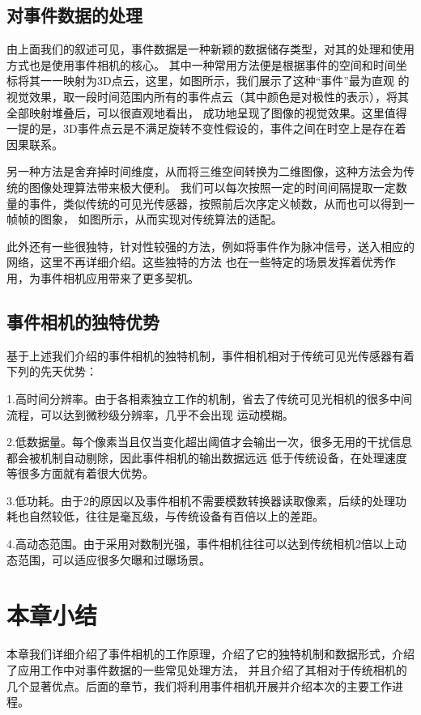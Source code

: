 \subsection{对事件数据的处理}
由上面我们的叙述可见，事件数据是一种新颖的数据储存类型，对其的处理和使用方式也是使用事件相机的核心。
其中一种常用方法便是根据事件的空间和时间坐标将其一一映射为3D点云，这里，如图所示，我们展示了这种“事件”最为直观
的视觉效果，取一段时间范围内所有的事件点云（其中颜色是对极性的表示），将其全部映射堆叠后，可以很直观地看出，
成功地呈现了图像的视觉效果。这里值得一提的是，3D事件点云是不满足旋转不变性假设的，事件之间在时空上是存在着因果联系。

另一种方法是舍弃掉时间维度，从而将三维空间转换为二维图像，这种方法会为传统的图像处理算法带来极大便利。
我们可以每次按照一定的时间间隔提取一定数量的事件，类似传统的可见光传感器，按照前后次序定义帧数，从而也可以得到一帧帧的图象，
如图所示，从而实现对传统算法的适配。

此外还有一些很独特，针对性较强的方法，例如将事件作为脉冲信号，送入相应的网络，这里不再详细介绍。这些独特的方法
也在一些特定的场景发挥着优秀作用，为事件相机应用带来了更多契机。

\subsection{事件相机的独特优势}
基于上述我们介绍的事件相机的独特机制，事件相机相对于传统可见光传感器有着下列的先天优势：

1.高时间分辨率。由于各相素独立工作的机制，省去了传统可见光相机的很多中间流程，可以达到微秒级分辨率，几乎不会出现
运动模糊。

2.低数据量。每个像素当且仅当变化超出阈值才会输出一次，很多无用的干扰信息都会被机制自动剔除，因此事件相机的输出数据远远
低于传统设备，在处理速度等很多方面就有着很大优势。

3.低功耗。由于2的原因以及事件相机不需要模数转换器读取像素，后续的处理功耗也自然较低，往往是毫瓦级，与传统设备有百倍以上的差距。

4.高动态范围。由于采用对数制光强，事件相机往往可以达到传统相机2倍以上动态范围，可以适应很多欠曝和过曝场景。

\section{本章小结}
本章我们详细介绍了事件相机的工作原理，介绍了它的独特机制和数据形式，介绍了应用工作中对事件数据的一些常见处理方法，
并且介绍了其相对于传统相机的几个显著优点。后面的章节，我们将利用事件相机开展并介绍本次的主要工作进程。